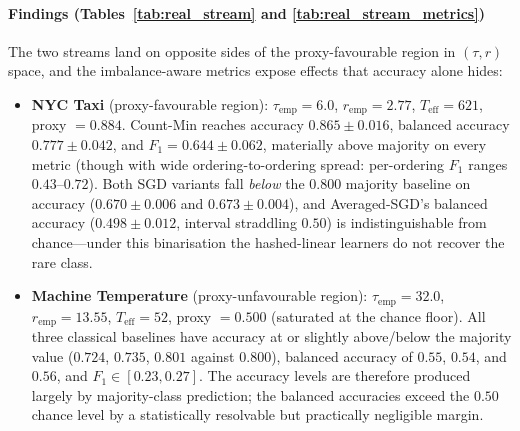 \documentclass[sensors,article,submit,pdftex,moreauthors]{Definitions/mdpi}
\newcommand{\Teff}{T_{\mathrm{eff}}}
\providecommand{\DIFadd}[1]{{\protect\color{blue}#1}} %
\providecommand{\DIFdel}[1]{} %
\providecommand{\DIFaddbegin}{} %
\providecommand{\DIFaddend}{} %
\providecommand{\DIFdelbegin}{} %
\providecommand{\DIFdelend}{} %
\begin{document}
\paragraph{Findings (Tables~\ref{tab:real_stream} and \ref{tab:real_stream_metrics})} The two streams land on opposite sides of the proxy-favourable region in $(\tau, r)$ space, and the imbalance-aware metrics expose effects that accuracy alone hides:
\begin{itemize}
    \item \textbf{NYC Taxi} (\DIFaddbegin \DIFadd{proxy-}\DIFaddend favourable region): $\tau_{\text{emp}} = 6.0$, $r_{\text{emp}} = 2.77$, $\Teff = 621$, proxy $= 0.884$. Count-Min reaches accuracy $0.865 \pm 0.016$, balanced accuracy \DIFdelbegin \DIFdel{$0.777$, and $F_1 = 0.644$}\DIFdelend \DIFaddbegin \DIFadd{$0.777 \pm 0.042$, and $F_1 = 0.644 \pm 0.062$}\DIFaddend , materially above majority on every metric \DIFdelbegin \DIFdel{. Online-SGD and Averaged-SGD have lower }\DIFdelend \DIFaddbegin \DIFadd{(though with wide ordering-to-ordering spread: per-ordering $F_1$ ranges $0.43$--$0.72$). Both SGD variants fall }\emph{\DIFadd{below}} \DIFadd{the $0.800$ majority baseline on }\DIFaddend accuracy ($0.670 \pm 0.006$ and $0.673 \pm 0.004$)\DIFdelbegin \DIFdel{and balanced accuracy near $0.50$, indicating they }\DIFdelend \DIFaddbegin \DIFadd{, and Averaged-SGD's balanced accuracy ($0.498 \pm 0.012$, interval straddling $0.50$) is indistinguishable from chance---under this binarisation the hashed-linear learners do not }\DIFaddend recover the rare class\DIFdelbegin \DIFdel{only weakly under hashed-linear features}\DIFdelend .
    \item \textbf{Machine Temperature} (\DIFaddbegin \DIFadd{proxy-}\DIFaddend unfavourable region): $\tau_{\text{emp}} = 32.0$, $r_{\text{emp}} = 13.55$, $\Teff = 52$, proxy $= 0.500$ (saturated at the chance floor). All three classical baselines have accuracy \DIFdelbegin \DIFdel{near }\DIFdelend \DIFaddbegin \DIFadd{at or slightly above/below }\DIFaddend the majority value ($0.724$, $0.735$, $0.801$ \DIFdelbegin \DIFdel{), but balanced accuracy is only }\DIFdelend \DIFaddbegin \DIFadd{against $0.800$), balanced accuracy of }\DIFaddend $0.55$, $0.54$, and $0.56$\DIFaddbegin \DIFadd{, }\DIFaddend and $F_1 \in [0.23, 0.27]$. The accuracy \DIFdelbegin \DIFdel{gap above the saturated proxy is therefore largely }\DIFdelend \DIFaddbegin \DIFadd{levels are therefore produced largely by }\DIFaddend majority-class \DIFdelbegin \DIFdel{memorisation; on the imbalance-aware metrics no classical baseline meaningfully exceeds chance for the rare class}\DIFdelend \DIFaddbegin \DIFadd{prediction; the balanced accuracies exceed the $0.50$ chance level by a statistically resolvable but practically negligible margin}\DIFaddend .
\end{itemize}
\end{document}
